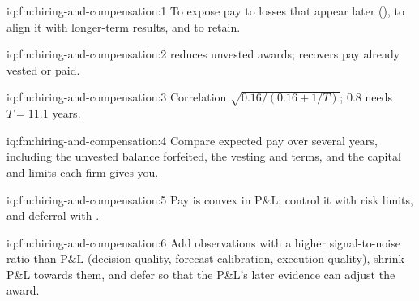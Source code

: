 \begin{solution}{iq:fm:hiring-and-compensation:1}
To expose pay to losses that appear later (), to align it with longer-term results, and to retain.
\end{solution}

\begin{solution}{iq:fm:hiring-and-compensation:2}
 reduces unvested awards;  recovers pay already vested or paid.
\end{solution}

\begin{solution}{iq:fm:hiring-and-compensation:3}
Correlation $\sqrt{0.16/(0.16+1/T)}$; 0.8 needs $T=11.1$ years.
\end{solution}

\begin{solution}{iq:fm:hiring-and-compensation:4}
Compare expected pay over several years, including the unvested balance forfeited, the vesting and  terms, and the capital and limits each firm
gives you.
\end{solution}

\begin{solution}{iq:fm:hiring-and-compensation:5}
Pay is convex in P\&L; control it with risk limits,  and deferral with .
\end{solution}

\begin{solution}{iq:fm:hiring-and-compensation:6}
Add observations with a higher signal-to-noise ratio than P\&L (decision quality, forecast calibration, execution quality), shrink P\&L towards
them, and defer so that the P\&L's later evidence can adjust the award.
\end{solution}
